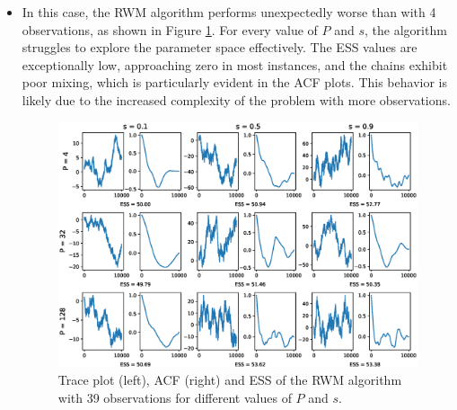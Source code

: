 \documentclass{article}
\begin{document}
\begin{itemize}

\item{
    In this case, the RWM algorithm performs unexpectedly worse than with 4 observations, as shown in Figure \ref{fig:RWM2}. For every
    value of \(P\) and \(s\), the algorithm struggles to explore the parameter space effectively.
    The ESS values are exceptionally low, approaching zero in most instances, and the chains exhibit poor mixing, which is 
    particularly evident in the ACF plots. This behavior is likely due to the increased complexity of the problem with more
    observations. 
    \begin{figure}[H]
        \centering
        \includegraphics[width=\textwidth]{plots/RWM2.eps}
        \caption{Trace plot (left), ACF (right) and ESS of the RWM algorithm with 39 observations for different values of \(P\) and \(s\).}
        \label{fig:RWM2}
    \end{figure}
}


\end{itemize}
\end{document}
